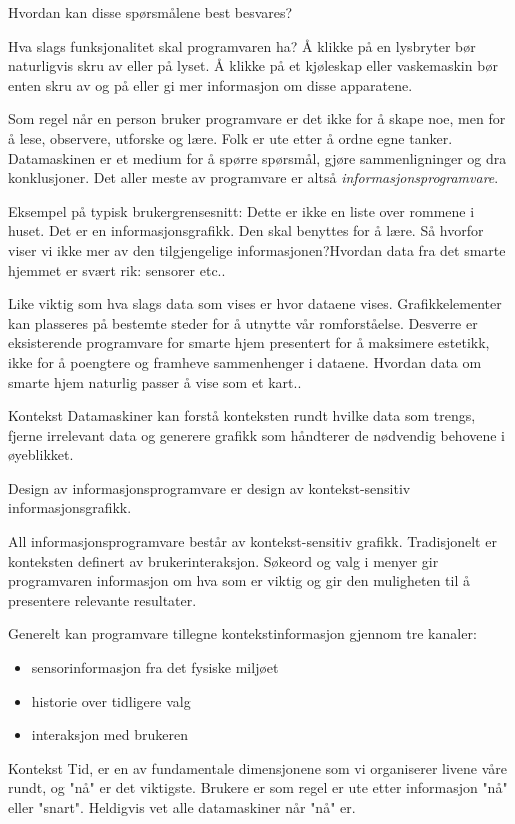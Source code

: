 Hvordan kan disse spørsmålene best besvares?

Hva slags funksjonalitet skal programvaren ha? Å klikke på en lysbryter bør naturligvis skru av eller på lyset. Å klikke på et kjøleskap eller vaskemaskin bør enten skru av og på eller gi mer informasjon om disse apparatene.

Som regel når en person bruker programvare er det ikke for å skape noe, men for å lese, observere, utforske og lære. Folk er ute etter å ordne egne tanker. Datamaskinen er et medium for å spørre spørsmål, gjøre sammenligninger og dra konklusjoner. Det aller meste av programvare er altså \emph{informasjonsprogramvare}. 


Eksempel på typisk brukergrensesnitt:
Dette er ikke en liste over rommene i huset. Det er en informasjonsgrafikk. Den skal benyttes for å lære. Så hvorfor viser vi ikke mer av den tilgjengelige informasjonen?{\color{red}Hvordan data fra det smarte hjemmet er svært rik: sensorer etc..}

Like viktig som hva slags data som vises er hvor dataene vises. Grafikkelementer kan plasseres på bestemte steder for å utnytte vår romforståelse. Desverre er eksisterende programvare for smarte hjem presentert for å maksimere estetikk, ikke for å poengtere og framheve sammenhenger i dataene. {\color{red}Hvordan data om smarte hjem naturlig passer å vise som et kart..}

Kontekst
Datamaskiner kan forstå konteksten rundt hvilke data som trengs, fjerne irrelevant data og generere grafikk som håndterer de nødvendig behovene i øyeblikket.

Design av informasjonsprogramvare er design av kontekst-sensitiv informasjonsgrafikk.

All informasjonsprogramvare består av kontekst-sensitiv grafikk. Tradisjonelt er konteksten definert av brukerinteraksjon. Søkeord og valg i menyer gir programvaren informasjon om hva som er viktig og gir den muligheten til å presentere relevante resultater.

Generelt kan programvare tillegne kontekstinformasjon gjennom tre kanaler:
\begin{itemize}
\item sensorinformasjon fra det fysiske miljøet
\item historie over tidligere valg
\item interaksjon med brukeren
\end{itemize}

Kontekst
Tid, er en av fundamentale dimensjonene som vi organiserer livene våre rundt, og "nå" er det viktigste. Brukere er som regel er ute etter informasjon "nå" eller "snart". Heldigvis vet alle datamaskiner når "nå" er.

